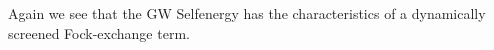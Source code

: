 \documentclass[12pt,a4paper]{scrartcl}
\numberwithin{equation}{section}
\begin{document}
Again we see that the GW Selfenergy has the characteristics
of a dynamically screened Fock-exchange term. 

\end{document}
